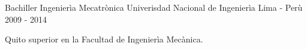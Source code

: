 

\begin{cventries}

  \cventry
    {Bachiller Ingenier\`{i}a Mecatr\`{o}nica} %
    {Univerisdad Nacional de Ingenier\`{i}a} %
    {Lima - Per\`{u}} %
    {2009 - 2014} %
    {
      \begin{cvitems} %
        \item {Quito superior en la Facultad de Ingenier\`{i}a Mec\`{a}nica.}
      \end{cvitems}
    }

\end{cventries}
